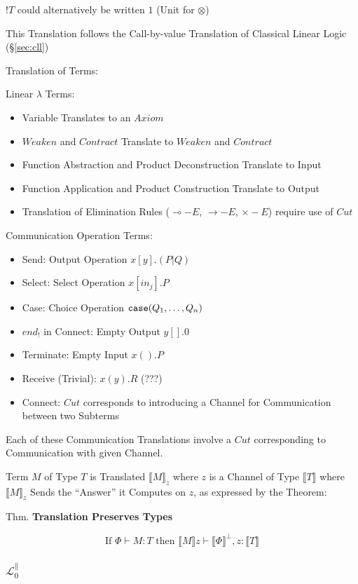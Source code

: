$!T$ could alternatively be written $1$ (Unit for $\otimes$)

This Translation follows the Call-by-value Translation of Classical
Linear Logic (\S\ref{sec:cll})

Translation of Terms:

Linear $\lambda$ Terms:
\begin{itemize}
  \item Variable Translates to an $Axiom$
  \item $Weaken$ and $Contract$ Translate to $Weaken$ and $Contract$
  \item Function Abstraction and Product Deconstruction Translate to
    Input
  \item Function Application and Product Construction Translate to
    Output
  \item Translation of Elimination Rules ($\multimap-E$,
    $\rightarrow-E$, $\times-E$) require use of $Cut$
\end{itemize}

Communication Operation Terms:
\begin{itemize}
  \item Send: Output Operation $x[y].(P|Q)$
  \item Select: Select Operation $x[in_j].P$
  \item Case: Choice Operation $\mathtt{case}(Q_1, \ldots, Q_n)$
  \item $end_!$ in Connect: Empty Output $y[].0$
  \item Terminate: Empty Input $x().P$
  \item Receive (Trivial): $x(y).R$ (???)
  \item Connect: $Cut$ corresponds to introducing a Channel for
    Communication between two Subterms
\end{itemize}
Each of these Communication Translations involve a $Cut$ corresponding
to Communication with given Channel.

Term $M$ of Type $T$ is Translated $\llbracket M \rrbracket_z$ where
$z$ is a Channel of Type $\llbracket T \rrbracket$ where $\llbracket M
\rrbracket_z$ Sends the ``Answer'' it Computes on $z$, as expressed by
the Theorem:

Thm. \textbf{Translation Preserves Types}

\[
  \text{If } \Phi \vdash M : T \text{ then }
  \llbracket M \rrbracket z \vdash \llbracket \Phi \rrbracket^\bot,
  z : \llbracket T \rrbracket
\]



\subsubsection{$\mathcal{L}^\parallel_0$}\label{sec:l_par_zero}

